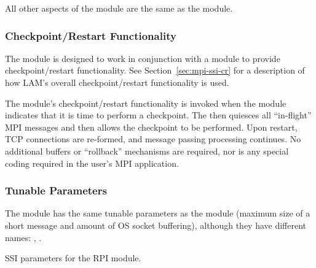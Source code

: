 All other aspects of the  module are the same as the
 module.


\subsubsection{Checkpoint/Restart Functionality}

The  module is designed to work in conjunction with a
 module to provide checkpoint/restart functionality.  See
Section~\ref{sec:mpi-ssi-cr} for a description of how LAM's overall
checkpoint/restart functionality is used.

The  module's checkpoint/restart functionality is invoked
when the  module indicates that it is time to perform a
checkpoint.  The  then quiesces all ``in-flight'' MPI
messages and then allows the checkpoint to be performed.  Upon
restart, TCP connections are re-formed, and message passing processing
continues.  No additional buffers or ``rollback'' mechanisms are
required, nor is any special coding required in the user's MPI
application.


\subsubsection{Tunable Parameters}


The  module has the same tunable parameters as the
 module (maximum size of a short message and amount of OS
socket buffering), although they have different names:
,
.


\begin{table}[htbp]
  \begin{ssiparamtb}
%
%
%
  \end{ssiparamtb}
  \caption{SSI parameters for the  RPI module.}
  \label{tbl:mpi-ssi-crtcp-ssi-params}
\end{table}

